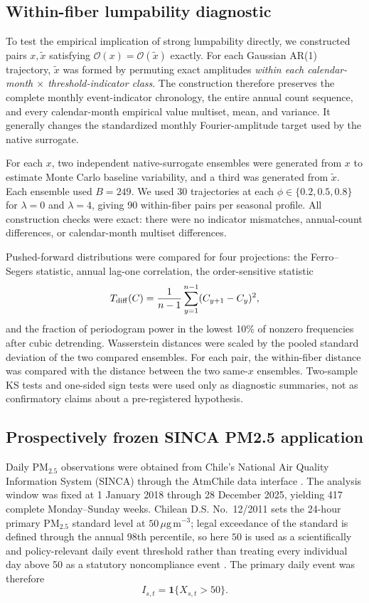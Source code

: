\subsection{Within-fiber lumpability diagnostic}\label{sec:fibermethods}

To test the empirical implication of strong lumpability directly, we constructed pairs $x,\widetilde x$ satisfying $\mathcal O(x)=\mathcal O(\widetilde x)$ exactly. For each Gaussian AR(1) trajectory, $\widetilde x$ was formed by permuting exact amplitudes \emph{within each calendar-month $\times$ threshold-indicator class}. The construction therefore preserves the complete monthly event-indicator chronology, the entire annual count sequence, and every calendar-month empirical value multiset, mean, and variance. It generally changes the standardized monthly Fourier-amplitude target used by the native surrogate.

For each $x$, two independent native-surrogate ensembles were generated from $x$ to estimate Monte Carlo baseline variability, and a third was generated from $\widetilde x$. Each ensemble used $B=249$. We used 30 trajectories at each $\phi\in\{0.2,0.5,0.8\}$ for $\lambda=0$ and $\lambda=4$, giving 90 within-fiber pairs per seasonal profile. All construction checks were exact: there were no indicator mismatches, annual-count differences, or calendar-month multiset differences.

Pushed-forward distributions were compared for four projections: the Ferro--Segers statistic, annual lag-one correlation, the order-sensitive statistic
\[
T_{\rm diff}(C)=\frac{1}{n-1}\sum_{y=1}^{n-1}(C_{y+1}-C_y)^2,
\]
and the fraction of periodogram power in the lowest 10\% of nonzero frequencies after cubic detrending. Wasserstein distances were scaled by the pooled standard deviation of the two compared ensembles. For each pair, the within-fiber distance was compared with the distance between the two same-$x$ ensembles. Two-sample KS tests and one-sided sign tests were used only as diagnostic summaries, not as confirmatory claims about a pre-registered hypothesis.

\subsection{Prospectively frozen SINCA PM2.5 application}\label{sec:sincamethods}

Daily PM$_{2.5}$ observations were obtained from Chile's National Air Quality Information System (SINCA) through the AtmChile data interface \cite{Catalan2022,SINCA2026}. The analysis window was fixed at 1 January 2018 through 28 December 2025, yielding 417 complete Monday--Sunday weeks. Chilean D.S. No.~12/2011 sets the 24-hour primary PM$_{2.5}$ standard level at $50\,\mu\mathrm{g\,m^{-3}}$; legal exceedance of the standard is defined through the annual 98th percentile, so here $50$ is used as a scientifically and policy-relevant daily event threshold rather than treating every individual day above 50 as a statutory noncompliance event \cite{MMA2011}. The primary daily event was therefore
\[
I_{s,t}=\mathbf 1\{X_{s,t}>50\}.
\]


